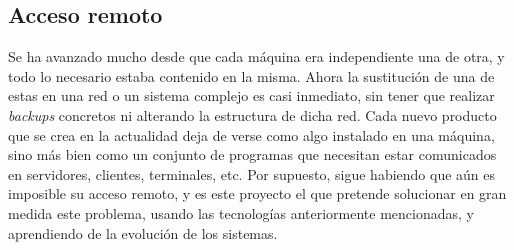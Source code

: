 \subsection{Acceso remoto}
Se ha avanzado mucho desde que cada máquina era independiente una de 
otra, y todo lo necesario estaba contenido en la misma. Ahora la 
sustitución de una de estas en una red o un sistema complejo es casi 
inmediato, sin tener que realizar \emph{backups} concretos ni 
alterando la estructura de dicha red. Cada nuevo producto que se crea 
en la actualidad deja de verse como algo instalado en una máquina, 
sino más bien como un conjunto de programas que necesitan estar 
comunicados en servidores, clientes, terminales, etc. Por supuesto, 
sigue habiendo \hardware que aún es imposible su acceso remoto, y es 
este proyecto el que pretende solucionar en gran medida este problema, 
usando las tecnologías anteriormente mencionadas, y aprendiendo de la 
evolución de los sistemas.

\cleardoublepage
